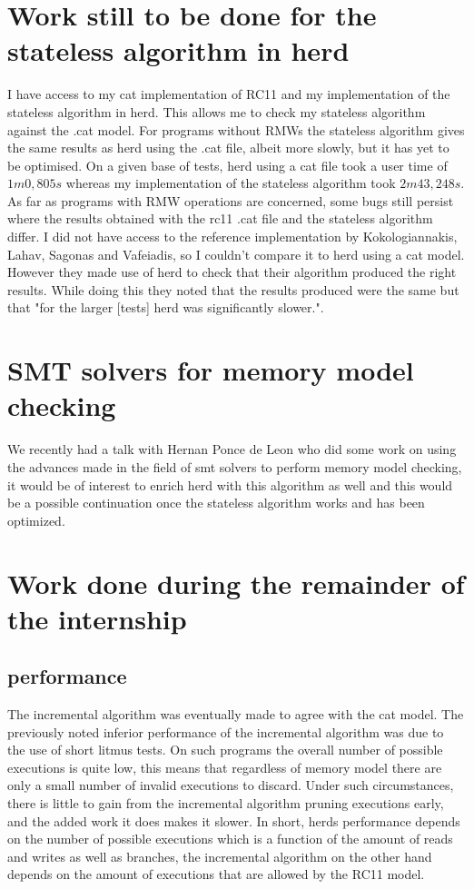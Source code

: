 \documentclass[a4,11pt,dvipsnames]{article}
\begin{document}
\section{Work still to be done for the stateless algorithm in herd}

I have access to my cat implementation of RC11 and my implementation of the stateless algorithm in herd. This allows me to check my stateless algorithm against the .cat model. For programs without RMWs the stateless algorithm gives the same results as herd using the .cat file, albeit more slowly, but it has yet to be optimised. On a given base of tests, herd using a cat file took a user time of $1m0,805s$ whereas my implementation of the stateless algorithm took $2m43,248s$. As far as programs with RMW operations are concerned, some bugs still persist where the results obtained with the rc11 .cat file and the stateless algorithm differ. I did not have access to the reference implementation by Kokologiannakis, Lahav, Sagonas and Vafeiadis, so I couldn't compare it to herd using a cat model. However they made use of herd to check that their algorithm produced the right results. While doing this they noted that the results produced were the same but that "for the larger [tests] herd was significantly slower.".

\section{SMT solvers for memory model checking}

We recently had a talk with Hernan Ponce de Leon who did some work on using the advances made in the field of smt solvers to perform memory model checking, it would be of interest to enrich herd with this algorithm as well and this would be a possible continuation once the stateless algorithm works and has been optimized.

\section{Work done during the remainder of the internship}

\subsection{performance}

The incremental algorithm was eventually made to agree with the cat model. The previously noted inferior performance of the incremental algorithm was due to the use of short litmus tests. On such programs the overall number of possible executions is quite low, this means that regardless of memory model there are only a small number of invalid executions to discard. Under such circumstances, there is little to gain from the incremental algorithm pruning executions early, and the added work it does makes it slower. In short, herds performance depends on the number of possible executions which is a function of the amount of reads and writes as well as branches, the incremental algorithm on the other hand depends on the amount of executions that are allowed by the RC11 model.
\end{document}

